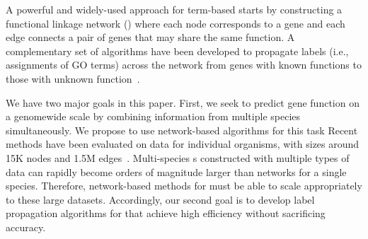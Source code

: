 A powerful and widely-used approach for term-based \pfp starts by constructing a functional linkage network (\FLN) where each node corresponds to a gene and each edge connects a pair of genes that may share the same function. 
A complementary set of algorithms have been developed  to propagate labels (i.e., assignments of GO terms) across the network from genes with known functions to those with unknown function~\cite{DZM+03,LK03,VFM+03,karaoz-kasif-whole-genome-annotation-pnas-2004,weston-noble-protein-ranking-pnas-2004}.




We have two major goals in this paper. 
First, we seek to predict gene function on a genomewide scale by combining information from multiple species simultaneously.  We propose to use network-based algorithms for this task %
Recent \pfp methods have been evaluated on data for individual organisms, with \FLN sizes 
around 15K nodes and 1.5M edges~\cite{Jiang-Gribskov-AptRank-protein-function-prediction-bioinfo-2017,cho-peng-mashup-cellsys-2016}. 
Multi-species \FLN{}s constructed with multiple types of data can rapidly become orders of magnitude larger than networks for a single species. Therefore, network-based methods for \pfp must be able to scale appropriately to these large datasets. Accordingly, our second goal is to develop label propagation algorithms for \pfp that achieve high efficiency without sacrificing accuracy.


